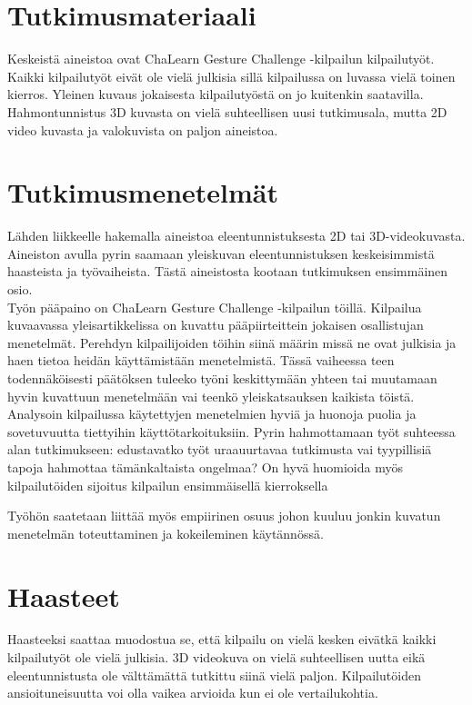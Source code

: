 \documentclass[12pt,a4paper,finnish,oneside]{article}
\begin{document}
\section{Tutkimusmateriaali}

Keskeistä aineistoa ovat ChaLearn Gesture Challenge -kilpailun kilpailutyöt. Kaikki kilpailutyöt eivät ole vielä julkisia sillä kilpailussa on luvassa vielä toinen kierros.
Yleinen kuvaus jokaisesta kilpailutyöstä on jo kuitenkin saatavilla. Hahmontunnistus 3D kuvasta on vielä suhteellisen uusi tutkimusala, mutta 2D video kuvasta ja valokuvista on paljon aineistoa.


\section{Tutkimusmenetelmät}


Lähden liikkeelle hakemalla aineistoa eleentunnistuksesta 2D tai 3D-videokuvasta. Aineiston avulla pyrin saamaan yleiskuvan eleentunnistuksen keskeisimmistä haasteista ja työvaiheista. Tästä aineistosta kootaan tutkimuksen  ensimmäinen osio.\\
Työn pääpaino on ChaLearn Gesture Challenge -kilpailun töillä. Kilpailua kuvaavassa yleisartikkelissa on kuvattu pääpiirteittein jokaisen osallistujan menetelmät. Perehdyn kilpailijoiden töihin siinä määrin missä ne ovat julkisia ja haen tietoa heidän käyttämistään menetelmistä. Tässä vaiheessa teen todennäköisesti päätöksen tuleeko työni keskittymään yhteen tai muutamaan hyvin kuvattuun menetelmään vai teenkö yleiskatsauksen kaikista töistä.\\
Analysoin kilpailussa käytettyjen menetelmien hyviä ja huonoja puolia ja sovetuvuutta tiettyihin käyttötarkoituksiin. Pyrin hahmottamaan työt suhteessa alan tutkimukseen: edustavatko työt uraauurtavaa tutkimusta vai tyypillisiä tapoja hahmottaa tämänkaltaista ongelmaa? On hyvä huomioida myös kilpailutöiden sijoitus kilpailun ensimmäisellä kierroksella

Työhön saatetaan liittää myös empiirinen osuus johon kuuluu jonkin kuvatun menetelmän toteuttaminen ja kokeileminen käytännössä.

\section{Haasteet}

Haasteeksi saattaa muodostua se, että kilpailu on vielä kesken eivätkä kaikki kilpailutyöt ole vielä julkisia.
3D videokuva on vielä suhteellisen uutta eikä eleentunnistusta ole välttämättä tutkittu siinä vielä paljon.
Kilpailutöiden ansioituneisuutta voi olla vaikea arvioida kun ei ole vertailukohtia.
\end{document}
